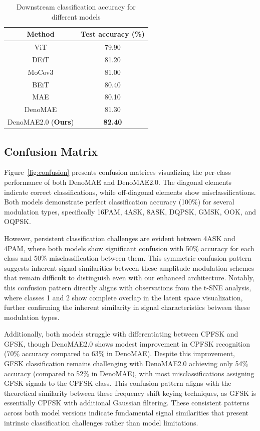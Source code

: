 \begin{table}[htbp]
    \centering
    \caption{Downstream classification accuracy for different models}
    \begin{tabular}{cc}
        \hline
        \textbf{Method} & \textbf{Test accuracy (\%)} \\ \hline
        ViT \cite{dosovitskiy2020image} & 79.90 \\ 
        DEiT \cite{touvron2021training} & 81.20 \\ 
        MoCov3 \cite{xie2021self} & 81.00 \\ 
        BEiT \cite{bao2021beit} & 80.40 \\
        MAE \cite{he2022masked} &  80.10 \\ 
        DenoMAE \cite{faysal2025denomae} &  81.30 \\
        DenoMAE2.0  (\textbf{Ours}) &  \textbf{82.40} \\ \hline
    \end{tabular}
    \label{tab:example}
\end{table}

\subsection{Confusion Matrix}

Figure~\ref{fig:confusion} presents confusion matrices visualizing the per-class performance of both DenoMAE and DenoMAE2.0. The diagonal elements indicate correct classifications, while off-diagonal elements show misclassifications. Both models demonstrate perfect classification accuracy (100\%) for several modulation types, specifically 16PAM, 4ASK, 8ASK, DQPSK, GMSK, OOK, and OQPSK. 

However, persistent classification challenges are evident between 4ASK and 4PAM, where both models show significant confusion with 50\% accuracy for each class and 50\% misclassification between them. This symmetric confusion pattern suggests inherent signal similarities between these amplitude modulation schemes that remain difficult to distinguish even with our enhanced architecture. Notably, this confusion pattern directly aligns with observations from the t-SNE analysis, where classes 1 and 2 show complete overlap in the latent space visualization, further confirming the inherent similarity in signal characteristics between these modulation types.

Additionally, both models struggle with differentiating between CPFSK and GFSK, though DenoMAE2.0 shows modest improvement in CPFSK recognition (70\% accuracy compared to 63\% in DenoMAE). Despite this improvement, GFSK classification remains challenging with DenoMAE2.0 achieving only 54\% accuracy (compared to 52\% in DenoMAE), with most misclassifications assigning GFSK signals to the CPFSK class. This confusion pattern aligns with the theoretical similarity between these frequency shift keying techniques, as GFSK is essentially CPFSK with additional Gaussian filtering. These consistent patterns across both model versions indicate fundamental signal similarities that present intrinsic classification challenges rather than model limitations.

